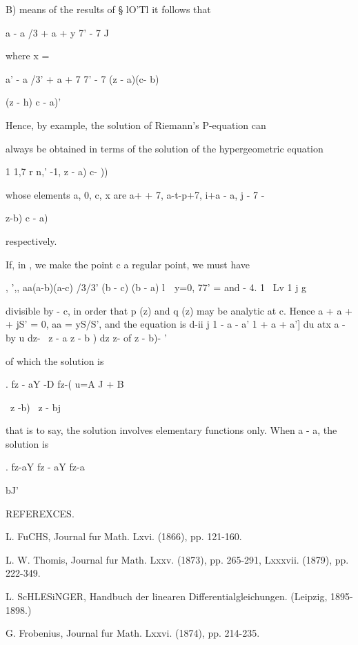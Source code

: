%
%


B) means of the results of § lO'Tl it follows that

 a - a /3 + a + y 7' - 7 J

where x =

a' - a /3' + a + 7 7' - 7 (z - a)(c- b)

(z - h) c - a)'

Hence, by  example, the solution of Riemann's P-equation can

always be obtained in terms of the solution of the hypergeometric
equation

1 1,7 r n,' -1, z - a) c- ))

whose elements a, 0, c, x are a+ + 7, a-t-p+7, i+a - a, j - 7 -

 z-b) c - a)

respectively.


If, in , we make the point c a regular point, we must have

, ',, aa(a-b)(a-c) /3/3' (b - c) (b - a) l\ \ y=0, 77' = and - 4. 1
\ Lv 1 j g

divisible by - c, in order that p (z) and q (z) may be analytic at c.
Hence a + a + + jS' = 0, aa = yS/S', and the equation is d-ii j 1 - a
- a' 1 + a + a'] du atx a - by u dz- \ z - a z - b ) dz z- of z - b)-
'

of which the solution is

. fz - aY -D fz-( u=A J + B

\ z -b) \ z - bj

that is to say, the solution involves elementary functions only. When
a - a, the solution is

. fz-aY fz - aY fz-a

bJ'

REFEREXCES.

L. FuCHS, Journal fur Math. Lxvi. (1866), pp. 121-160.

L. W. Thomis, Journal fur Math. Lxxv. (1873), pp. 265-291, Lxxxvii.
(1879), pp. 222-349.

L. ScHLESiNGER, Handbuch der linearen Differentialgleichungen.
(Leipzig, 1895-1898.)

G. Frobenius, Journal fur Math. Lxxvi. (1874), pp. 214-235.

